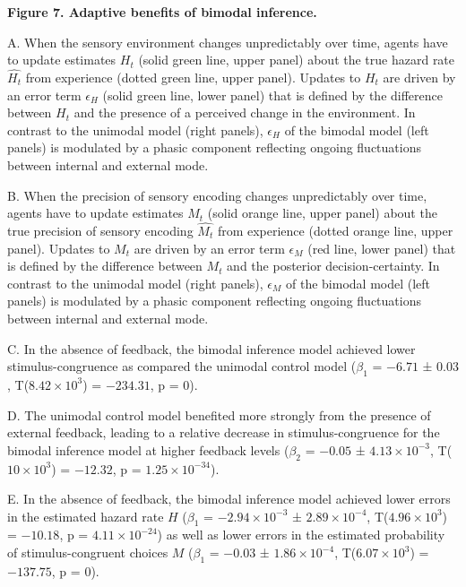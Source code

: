 \documentclass[
]{article}
\begin{document}
\textbf{Figure 7. Adaptive benefits of bimodal inference.}

A. When the sensory environment changes unpredictably over time, agents
have to update estimates \(H_t\) (solid green line, upper panel) about
the true hazard rate \(\hat{H_t}\) from experience (dotted green line,
upper panel). Updates to \(H_t\) are driven by an error term
\(\epsilon_H\) (solid green line, lower panel) that is defined by the
difference between \(H_t\) and the presence of a perceived change in the
environment. In contrast to the unimodal model (right panels),
\(\epsilon_H\) of the bimodal model (left panels) is modulated by a
phasic component reflecting ongoing fluctuations between internal and
external mode.

B. When the precision of sensory encoding changes unpredictably over
time, agents have to update estimates \(M_t\) (solid orange line, upper
panel) about the true precision of sensory encoding \(\hat{M_t}\) from
experience (dotted orange line, upper panel). Updates to \(M_t\) are
driven by an error term \(\epsilon_M\) (red line, lower panel) that is
defined by the difference between \(M_t\) and the posterior
decision-certainty. In contrast to the unimodal model (right panels),
\(\epsilon_M\) of the bimodal model (left panels) is modulated by a
phasic component reflecting ongoing fluctuations between internal and
external mode.

C. In the absence of feedback, the bimodal inference model achieved
lower stimulus-congruence as compared the unimodal control model
(\(\beta_1\) = \(-6.71\) ± \(0.03\),
T(\(\ensuremath{8.42\times 10^{3}}\)) = \(-234.31\), p = \(0\)).

D. The unimodal control model benefited more strongly from the presence
of external feedback, leading to a relative decrease in
stimulus-congruence for the bimodal inference model at higher feedback
levels (\(\beta_2\) = \(-0.05\) ± \(\ensuremath{4.13\times 10^{-3}}\),
T(\(\ensuremath{10\times 10^{3}}\)) = \(-12.32\), p =
\(\ensuremath{1.25\times 10^{-34}}\)).

E. In the absence of feedback, the bimodal inference model achieved
lower errors in the estimated hazard rate \(H\) (\(\beta_1\) =
\(\ensuremath{-2.94\times 10^{-3}}\) ±
\(\ensuremath{2.89\times 10^{-4}}\),
T(\(\ensuremath{4.96\times 10^{3}}\)) = \(-10.18\), p =
\(\ensuremath{4.11\times 10^{-24}}\)) as well as lower errors in the
estimated probability of stimulus-congruent choices \(M\) (\(\beta_1\) =
\(-0.03\) ± \(\ensuremath{1.86\times 10^{-4}}\),
T(\(\ensuremath{6.07\times 10^{3}}\)) = \(-137.75\), p = \(0\)).
\end{document}
